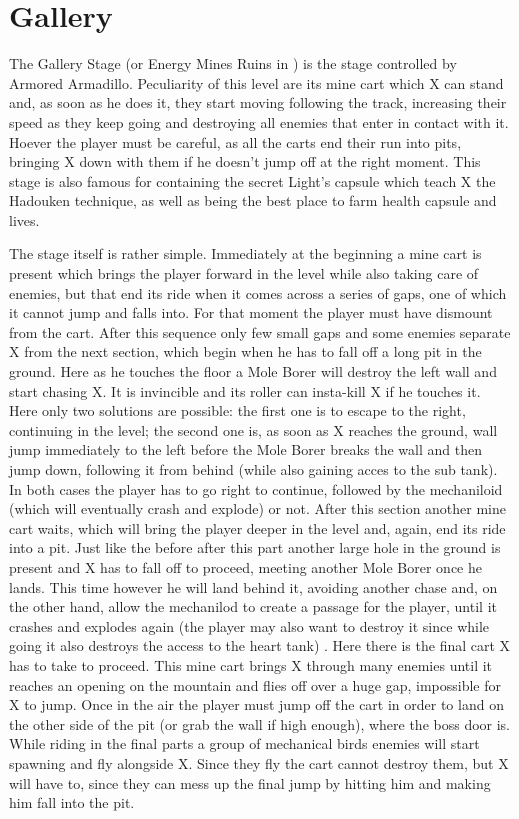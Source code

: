 \section{Gallery}
The Gallery Stage (or Energy Mines Ruins in \mhx) is the stage controlled by Armored Armadillo. Peculiarity of this level are its mine cart which X can stand and, as soon as he does it, they start moving following the track, increasing their speed as they keep going and destroying all enemies that enter in contact with it. Hoever the player must be careful, as all the carts end their run into pits, bringing X down with them if he doesn't jump off at the right moment. This stage is also famous for containing the secret Light's capsule which teach X the Hadouken technique, as well as being the best place to farm health capsule and lives.

The stage itself is rather simple. Immediately at the beginning a mine cart is present which brings the player forward in the level while also taking care of enemies, but that end its ride when it comes across a series of gaps, one of which it cannot jump and falls into. For that moment the player must have dismount from the cart. After this sequence only few small gaps and some enemies separate X from the next section, which begin when he has to fall off a long pit in the ground. Here as he touches the floor a Mole Borer will destroy the left wall and start chasing X. It is invincible and its roller can insta-kill X if he touches it. Here only two solutions are possible: the first one is to escape to the right, continuing in the level; the second one is, as soon as X reaches the ground, wall jump immediately to the left before the Mole Borer breaks the wall and then jump down, following it from behind (while also gaining acces to the sub tank). In both cases the player has to go right to continue, followed by the mechaniloid (which will eventually crash and explode) or not. After this section another mine cart waits, which will bring the player deeper in the level and, again, end its ride into a pit. Just like the before after this part another large hole in the ground is present and X has to fall off to proceed, meeting another Mole Borer once he lands. This time however he will land behind it, avoiding another chase and, on the other hand, allow the mechanilod to create a passage for the player, until it crashes and explodes again (the player may also want to destroy it since while going it also destroys the access to the heart tank) . Here there is the final cart X has to take to proceed. This mine cart brings X through many enemies until it reaches an opening on the mountain and flies off over a huge gap, impossible for X to jump. Once in the air the player must jump off the cart in order to land on the other side of the pit (or grab the wall if high enough), where the boss door is. While riding in the final parts a group of mechanical birds enemies will start spawning and fly alongside X. Since they fly the cart cannot destroy them, but X will have to, since they can mess up the final jump by hitting him and making him fall into the pit.

